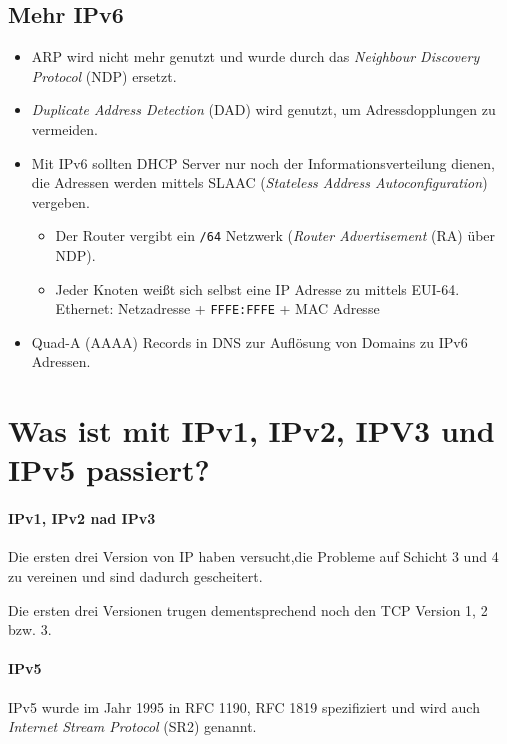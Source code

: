 \documentclass[a4paper, 11pt, accentcolor = tud3b]{tudreport}
\begin{document}
            \subsection{Mehr IPv6} %
	            \begin{itemize}
	            	\item ARP wird nicht mehr genutzt und wurde durch das \textit{Neighbour Discovery Protocol} (NDP) ersetzt.
	            	\item \textit{Duplicate Address Detection} (DAD) wird genutzt, um Adressdopplungen zu vermeiden.
	            	\item Mit IPv6 sollten DHCP Server nur noch der Informationsverteilung dienen, die Adressen werden mittels SLAAC (\textit{Stateless Address Autoconfiguration}) vergeben.
		            	\begin{itemize}
		            		\item Der Router vergibt ein \texttt{/64} Netzwerk (\textit{Router Advertisement} (RA) über NDP).
		            		\item Jeder Knoten weißt sich selbst eine IP Adresse zu mittels EUI-64. \\ Ethernet: Netzadresse + \texttt{FFFE:FFFE} + MAC Adresse
		            	\end{itemize}
		            \item Quad-A (AAAA) Records in DNS zur Auflösung von Domains zu IPv6 Adressen.
	            \end{itemize}
		
		\section{Was ist mit IPv1, IPv2, IPV3 und IPv5 passiert?}
			\paragraph{IPv1, IPv2 nad IPv3}
				Die ersten drei Version von IP haben versucht,die Probleme auf Schicht 3 und 4 zu vereinen und sind dadurch gescheitert.
				
				Die ersten drei Versionen trugen dementsprechend noch den TCP Version 1, 2 bzw. 3.
		
			\paragraph{IPv5}
				IPv5 wurde im Jahr 1995 in RFC 1190, RFC 1819 spezifiziert und wird auch \textit{Internet Stream Protocol} (SR2) genannt.
				
\end{document}

